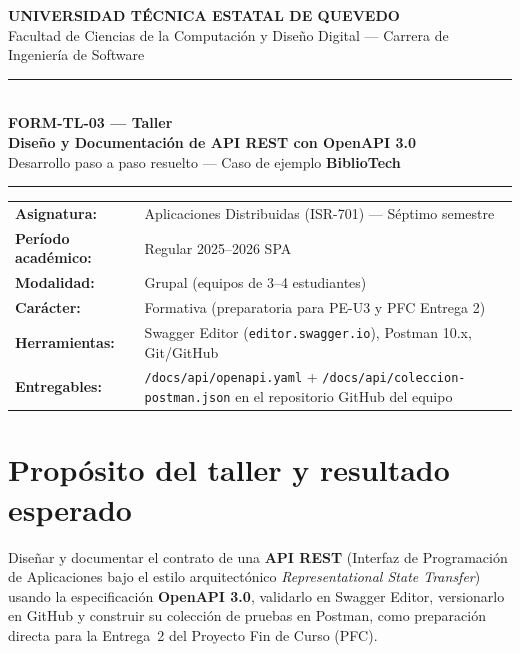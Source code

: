 \documentclass[11pt,a4paper]{article}
\begin{document}
\begin{center}
  {\large\bfseries\color{azuloscuro} UNIVERSIDAD TÉCNICA ESTATAL DE QUEVEDO}\\[2pt]
  Facultad de Ciencias de la Computación y Diseño Digital --- Carrera de Ingeniería de Software\\[8pt]
  {\color{teal}\rule{\textwidth}{1.2pt}}\\[10pt]
  {\LARGE\bfseries\color{azuloscuro} FORM-TL-03 --- Taller}\\[4pt]
  {\Large\bfseries Diseño y Documentación de API REST con OpenAPI 3.0}\\[6pt]
  {\large Desarrollo paso a paso resuelto --- Caso de ejemplo \textbf{BiblioTech}}\\[10pt]
  {\color{teal}\rule{\textwidth}{1.2pt}}
\end{center}

\vspace{4pt}
\begin{center}
\begin{tabular}{>{\bfseries}p{4.5cm} p{10.5cm}}
\toprule
Asignatura: & Aplicaciones Distribuidas (ISR-701) --- Séptimo semestre \\
Período académico: & Regular 2025--2026 SPA \\
Modalidad: & Grupal (equipos de 3--4 estudiantes) \\
Carácter: & Formativa (preparatoria para PE-U3 y PFC Entrega 2) \\
Herramientas: & Swagger Editor (\texttt{editor.swagger.io}), Postman 10.x, Git/GitHub \\
Entregables: & \texttt{/docs/api/openapi.yaml} + \texttt{/docs/api/coleccion-postman.json} en el repositorio GitHub del equipo \\
\bottomrule
\end{tabular}
\end{center}

\tableofcontents

\section{Propósito del taller y resultado esperado}

\begin{cajaobjetivo}
Diseñar y documentar el contrato de una \textbf{API REST} (Interfaz de Programación de Aplicaciones bajo el estilo arquitectónico \textit{Representational State Transfer}) usando la especificación \textbf{OpenAPI 3.0}, validarlo en Swagger Editor, versionarlo en GitHub y construir su colección de pruebas en Postman, como preparación directa para la Entrega~2 del Proyecto Fin de Curso (PFC).
\end{cajaobjetivo}
\end{document}
